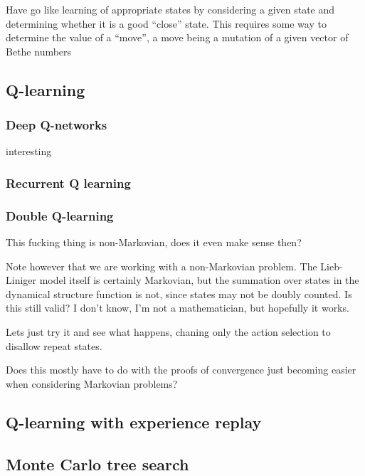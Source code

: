 \documentclass[11pt, a4paper]{report} %
\begin{document}
Have go like learning of appropriate states by considering a given state and determining whether it is a good ``close'' state.
This requires some way to determine the value of a ``move'', a move being a mutation of a given vector of Bethe numbers\cite{Silver2017}

\subsection{Q-learning}

\subsubsection{Deep Q-networks}

interesting\cite{mnih13_playin_atari_with_deep_reinf_learn,lillicrap15_contin_contr_with_deep_reinf_learn}

\subsubsection{Recurrent Q learning}
\cite{hausknecht15_deep_recur_q_learn_partial_obser_mdps}
\subsubsection{Double Q-learning}
\cite{hasselt15_deep_reinf_learn_with_doubl_q_learn}

This fucking thing is non-Markovian, does it even make sense then?

Note however that we are working with a non-Markovian problem.
The Lieb-Liniger model itself is certainly Markovian, but the summation over states in the dynamical structure function is not, since states may not be doubly counted.
Is this still valid?
I don't know, I'm not a mathematician, but hopefully it works.

Lets just try it and see what happens, chaning only the action selection to disallow repeat states.

Does this mostly have to do with the proofs of convergence just becoming easier when considering Markovian problems?

\subsection{Q-learning with experience replay}

\subsection{Monte Carlo tree search}
\end{document}
